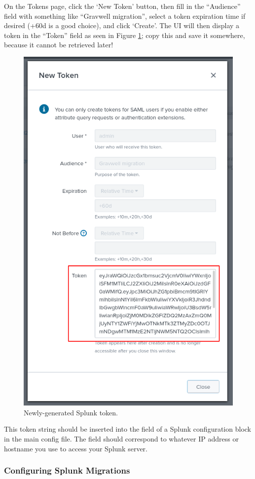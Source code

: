 On the Tokens page, click the `New Token' button, then fill in the ``Audience'' field with something like ``Gravwell migration'', select a token expiration time if desired (+60d is a good choice), and click `Create'. The UI will then display a token in the ``Token'' field as seen in Figure \ref{fig:newtoken}; copy this and save it somewhere, because it cannot be retrieved later!

\begin{figure}
	\includegraphics[width=0.8\linewidth]{images/newtoken.png}
	\caption{Newly-generated Splunk token.}
	\label{fig:newtoken}
\end{figure}

This token string should be inserted into the  field of a Splunk configuration block in the main config file. The  field should correspond to whatever IP address or hostname you use to access your Splunk server.

\clearpage
\subsubsection{Configuring Splunk Migrations}

